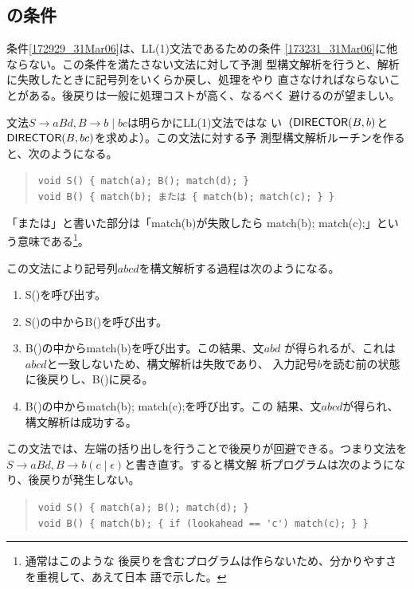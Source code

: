 \subsection{\Director の条件}

条件\ref{172929_31Mar06}は、LL(1)文法であるための条件
\eqref{173231_31Mar06}に他ならない。この条件を満たさない文法に対して予測
型構文解析を行うと、解析に失敗したときに記号列をいくらか戻し、処理をやり
直さなければならないことがある。後戻りは一般に処理コストが高く、なるべく
避けるのが望ましい。

\begin{example}
 文法$S \rightarrow aBd, B\rightarrow b \mid bc$は明らかにLL(1)文法ではな
 い（${\sf DIRECTOR}(B, b)$と${\sf DIRECTOR}(B, bc)$を求めよ）。この文法に対する予
 測型構文解析ルーチンを作ると、次のようになる。
 \begin{quote}
  \verb|void S() { match(a); B(); match(d); }| \\
  \verb|void B() { match(b); または { match(b); match(c); } }|
 \end{quote}
 「または」と書いた部分は「\textsf{match(b)}が失敗したら
 \textsf{match(b); match(c);}」という意味である\footnote{通常はこのような
 後戻りを含むプログラムは作らないため、分かりやすさを重視して、あえて日本
 語で示した。}。

 この文法により記号列$abcd$を構文解析する過程は次のようになる。
 \begin{enumerate}
  \item \textsf{S()}を呼び出す。
  \item \textsf{S()}の中から\textsf{B()}を呼び出す。
  \item \textsf{B()}の中から\textsf{match(b)}を呼び出す。この結果、文$abd$
	が得られるが、これは$abcd$と一致しないため、構文解析は失敗であり、
	入力記号$b$を読む前の状態に後戻りし、\textsf{B()}に戻る。
  \item \textsf{B()}の中から\textsf{match(b); match(c);}を呼び出す。この
	結果、文$abcd$が得られ、構文解析は成功する。
 \end{enumerate}

 この文法では、左端の括り出しを行うことで後戻りが回避できる。つまり文法を
 $S \rightarrow aBd, B \rightarrow b(c\mid\epsilon)$と書き直す。すると構文解
 析プログラムは次のようになり、後戻りが発生しない。
 \begin{quote}
  \verb|void S() { match(a); B(); match(d); }| \\
  \verb|void B() { match(b); { if (lookahead == 'c') match(c); } }|
 \end{quote}
\end{example}

